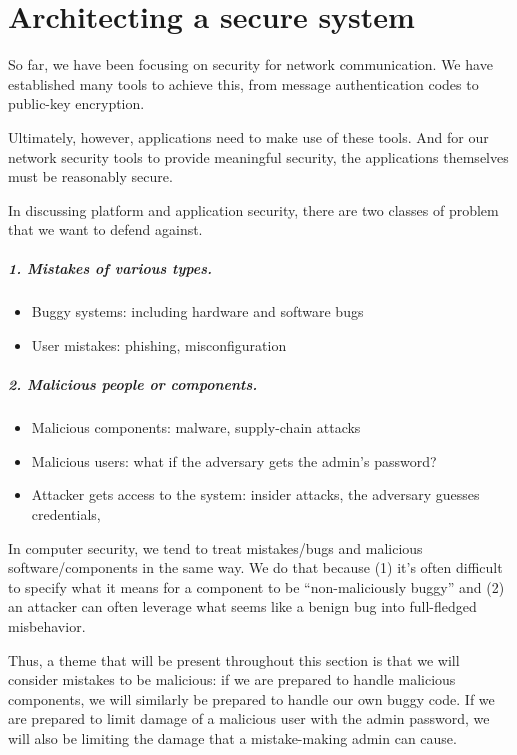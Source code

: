 \chapter{Architecting a secure system}

So far, we have been focusing on security for network communication. We have established many tools to achieve this, from message authentication codes to public-key encryption.

Ultimately, however, applications need to make use of these tools. And for our network security tools to provide meaningful security, the applications themselves must be reasonably secure. 

In discussing platform and application security, there are two classes of
problem that we want to defend against.
\paragraph{1. Mistakes of various types.}
\begin{itemize}
	\item Buggy systems: including hardware and software bugs
  \item User mistakes: phishing, misconfiguration
\end{itemize}

\paragraph{2. Malicious people or components.}
\begin{itemize}
	\item Malicious components: malware, supply-chain attacks
	\item Malicious users: what if the adversary gets the admin's password?
  \item Attacker gets access to the system: insider attacks, the adversary guesses credentials,
\end{itemize}

In computer security, we tend to treat mistakes/bugs and 
malicious software/components in the same way.
We do that because (1) it's often difficult to specify
what it means for a component to be ``non-maliciously buggy''
and (2) an attacker can often leverage what seems like a benign bug
into full-fledged misbehavior.

Thus, a theme that will be present throughout this section is that we will consider mistakes to be malicious: if we are prepared to handle malicious components, we will similarly be prepared to handle our own buggy code. If we are prepared to limit damage of a malicious user with the admin password, we will also be limiting the damage that a mistake-making admin can cause.

